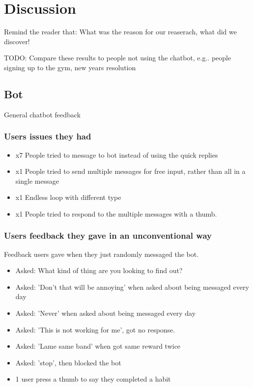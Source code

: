 \documentclass{scaffold/sigchi}
\begin{document}
\section{Discussion}
Remind the reader that: What was the reason for our reaserach, what did we discover!

TODO: Compare these results to people not using the chatbot, e.g.. people signing up to the gym, new years resolution



\subsection{Bot}
General chatbot feedback


\subsubsection{Users issues they had}

\begin{itemize}
  \item x7 People tried to message to bot instead of using the quick replies
  \item x1 People tried to send multiple messages for free input, rather than all in a single message
  \item x1 Endless loop with different type
  \item x1 People tried to respond to the multiple messages with a thumb.
\end{itemize}


\subsubsection{Users feedback they gave in an unconventional way}
Feedback users gave when they just randomly messaged the bot.

\begin{itemize}
  \item Asked: What kind of thing are you looking to find out?
  \item Asked: 'Don't that will be annoying' when asked about being messaged every day
  \item Asked: 'Never' when asked about being messaged every day
  \item Asked: 'This is not working for me', got no response.
  \item Asked: 'Lame same band' when got same reward twice
  \item Asked: 'stop', then blocked the bot
  \item 1 user press a thumb to say they completed a habit
\end{itemize}
\end{document}
